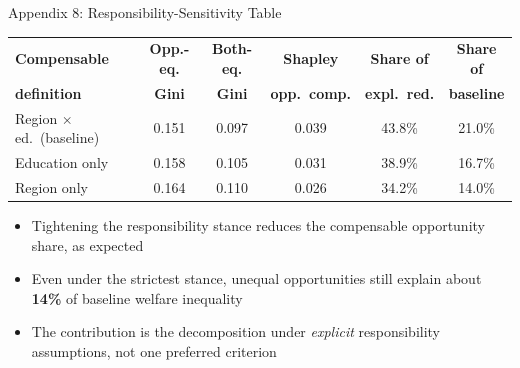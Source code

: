 \documentclass[aspectratio=169,11pt]{beamer}
\newcommand{\emphnum}[1]{\textcolor{cblue}{\textbf{#1}}}
\begin{document}
\begin{frame}{Appendix 8: Responsibility-Sensitivity Table}

\centering
\footnotesize
\begin{tabular}{@{}l ccccc@{}}
\toprule
\textbf{Compensable} & \textbf{Opp.-eq.} & \textbf{Both-eq.} & \textbf{Shapley} & \textbf{Share of} & \textbf{Share of} \\
\textbf{definition}  & \textbf{Gini}      & \textbf{Gini}     & \textbf{opp.\ comp.} & \textbf{expl.\ red.} & \textbf{baseline} \\
\midrule
Region $\times$ ed.\ (baseline) & 0.151 & 0.097 & 0.039 & 43.8\% & 21.0\% \\
Education only                    & 0.158 & 0.105 & 0.031 & 38.9\% & 16.7\% \\
Region only                       & 0.164 & 0.110 & 0.026 & 34.2\% & 14.0\% \\
\bottomrule
\end{tabular}

\bigskip
\begin{itemize}\footnotesize
\item Tightening the responsibility stance reduces the compensable opportunity share, as expected
\item Even under the strictest stance, unequal opportunities still explain about \emphnum{14\%} of baseline welfare inequality
\item The contribution is the decomposition under \emph{explicit} responsibility assumptions, not one preferred criterion
\end{itemize}
\end{frame}
\end{document}
